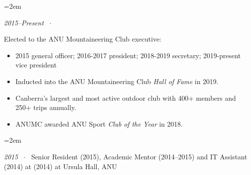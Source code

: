 \documentclass[DVI=12]{scrartcl}
\newcommand{\MarginText}[1]{\marginpar{\raggedleft\itshape\small#1}} %
\newcommand{\Description}[1]{\hangindent=2em\hangafter=0\noindent\raggedright\footnotesize{#1}\par\normalsize\vspace{1em}} %
\newcommand{\ShortDescription}[2]{\hangindent=2em\hangafter=0\noindent\raggedright{\small\textit{#1}}  \ $\cdotp$ \ \footnotesize{#2} \par\normalsize\vspace{1em}}
\begin{document}
\begin{cv}{}
\vspace{1em}

\ShortDescription{\MarginText{Service}2015--Present}{Elected to the ANU Mountaineering Club executive:
\begin{itemize}[leftmargin=.75in, label=] 
\vspace{-0.25em}
\item 2015 general officer; 2016-2017 president; 2018-2019 secretary; 2019-present vice president
\item Inducted into the ANU Mountaineering Club \emph{Hall of Fame} in 2019.
\item Canberra's largest and most active outdoor club with 400+ members and 250+ trips annually.
\item ANUMC awarded ANU Sport \emph{Club of the Year} in 2018.\end{itemize}}

%

\vspace{-0.75em} %

\ShortDescription{2015}{Senior Resident (2015), Academic Mentor (2014--2015) and IT Assistant {\color{white}(2014) at }(2014) at Ursula Hall, ANU}

%
%
%

%
%
%


\end{cv}
\end{document}
